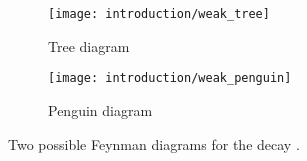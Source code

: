 \begin{figure}
  \begin{subfigure}{0.40\textwidth}
    \centering
    \texttt{[image: introduction/weak\_tree]}
    \caption{Tree diagram}
    \label{fig:intro:sm:weak_feynman:tree}
  \end{subfigure}
  \begin{subfigure}{0.55\textwidth}
    \centering
    \texttt{[image: introduction/weak\_penguin]}
    \caption{Penguin diagram}
    \label{fig:intro:sm:weak_feynman:penguin}
  \end{subfigure}
  \caption{%
    Two possible Feynman diagrams for the decay \decay{\PBzero}{\PKplus\Ppiminus}.
  }
  \label{fig:intro:sm:weak_feynman}
\end{figure}
